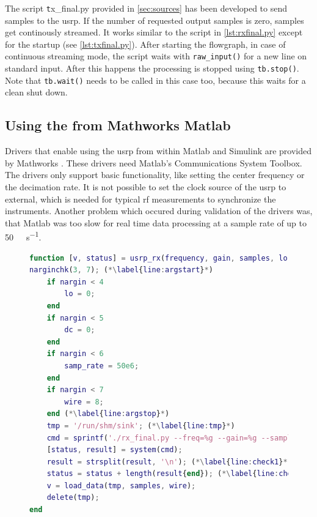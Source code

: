 \documentclass[12pt,a4paper,parskip=full,abstracton]{scrartcl}
\begin{document}
The script {\texttt tx\_final.py} provided in \cref{sec:sources} has been
developed to send samples to the \gls{usrp}. If the number of requested
output samples is zero, samples get continously streamed. It works similar
to the script in \cref{lst:rxfinal.py} except for the startup
(see \cref{lst:txfinal.py}). After starting the flowgraph, in case of continuous
streaming mode, the script waits with \lstinline{raw_input()}
for a new line on standard input. After this happens the processing is stopped
using \lstinline{tb.stop()}. Note that \lstinline{tb.wait()} needs to be called
in this case too, because this waits for a clean shut down.

\subsection{Using the  from Mathworks Matlab}
\label{sec:matlab}

Drivers that enable using the \gls{usrp} from within Matlab and Simulink are
provided by Mathworks \cite{matlab_usrp}. These drivers need Matlab's Communications
System Toolbox. The drivers only support basic functionality, like setting the center frequency
or the decimation rate. It is not possible to set the clock source of the
\gls{usrp} to external, which is needed for typical \gls{rf} measurements to
synchronize the instruments. Another problem which occured during validation of the drivers was, that Matlab
was too slow for real time data processing at a sample rate of up to
\SI{50}{\mega\samples\per\second}.

\begin{figure}[htb]
    \centering
    \begin{lstlisting}[language=matlab,basicstyle=\tiny,caption={Matlab \gls{usrp} \gls{rx} function ({\ttfamily usrp\_rx.m)}},label=lst:usrprx.m]
function [v, status] = usrp_rx(frequency, gain, samples, lo, dc, samp_rate, wire)
narginchk(3, 7); (*\label{line:argstart}*)
    if nargin < 4
        lo = 0;
    end
    if nargin < 5
        dc = 0;
    end
    if nargin < 6
        samp_rate = 50e6;
    end
    if nargin < 7
        wire = 8;
    end (*\label{line:argstop}*)
    tmp = '/run/shm/sink'; (*\label{line:tmp}*)
    cmd = sprintf('./rx_final.py --freq=%g --gain=%g --samples=%d --filename=%s --lo-off=%g --dc=%d --samp-rate=%g --wire=%d', frequency, gain, samples, tmp, lo, dc, samp_rate, wire);
    [status, result] = system(cmd);
    result = strsplit(result, '\n'); (*\label{line:check1}*)
    status = status + length(result{end}); (*\label{line:check2}*)
    v = load_data(tmp, samples, wire);
    delete(tmp);
end
    \end{lstlisting}
\end{figure}
\end{document}
